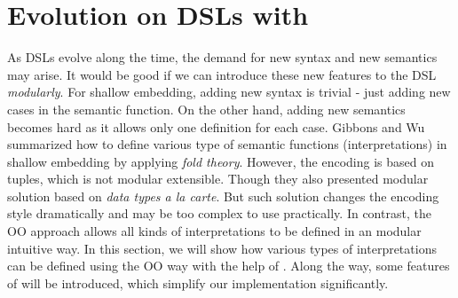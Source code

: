 \section{Evolution on DSLs with \name}

\begin{comment}
Weixin writes this one.

Go over jeremy's examples, maybe having only 3 diagram 
constructs instead of 5 for space reasons.

Use five constructs to show extensibility.

Think of how to introduce our tool? Using the Jeremy's examples? 
or introducing before with some other examples?

\end{comment}

As DSLs evolve along the time, the demand for new syntax and new semantics may arise.
It would be good if we can introduce these new features to the DSL \emph{modularly}.
For shallow embedding, adding new syntax is trivial - just adding new cases in
the semantic function. On the other hand, adding new semantics becomes hard as it allows
only one definition for each case. Gibbons and Wu summarized how to define
various type of semantic functions (interpretations) in shallow embedding by
applying \emph{fold theory}. However, the encoding is based on tuples, which is
not modular extensible. Though they also presented modular solution based on
\emph{data types a la carte}\cite{swierstra2008data}. But such solution changes the encoding style
dramatically and may be too complex to use practically.
In contrast, the OO approach allows all kinds of
interpretations to be defined in an modular intuitive way.
In this section, we will show how various types of interpretations can be
defined using the OO way with the help of \name. Along the way,
some features of \name will be introduced, which simplify our implementation significantly.



